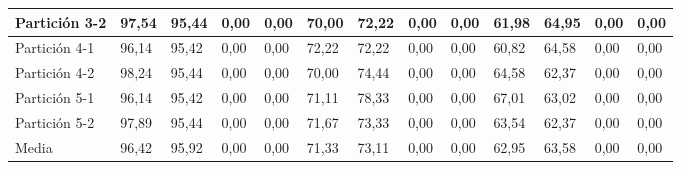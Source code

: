 \documentclass[10pt,a4paper]{article}
\begin{document}
\begin{table}[H]
{\begin{tabular}{l|l|l|l|l|l|l|l|l|l|l|l|l|}
\multicolumn{1}{|l|}{Partición 3-2} & 97,54        & 95,44         & 0,00    & 0,00 & 70,00        & 72,22         & 0,00    & 0,00 & 61,98        & 64,95         & 0,00    & 0,00 \\ \hline
\multicolumn{1}{|l|}{Partición 4-1} & 96,14        & 95,42         & 0,00    & 0,00 & 72,22        & 72,22         & 0,00    & 0,00 & 60,82        & 64,58         & 0,00    & 0,00 \\ \hline
\multicolumn{1}{|l|}{Partición 4-2} & 98,24        & 95,44         & 0,00    & 0,00 & 70,00        & 74,44         & 0,00    & 0,00 & 64,58        & 62,37         & 0,00    & 0,00 \\ \hline
\multicolumn{1}{|l|}{Partición 5-1} & 96,14        & 95,42         & 0,00    & 0,00 & 71,11        & 78,33         & 0,00    & 0,00 & 67,01        & 63,02         & 0,00    & 0,00 \\ \hline
\multicolumn{1}{|l|}{Partición 5-2} & 97,89        & 95,44         & 0,00    & 0,00 & 71,67        & 73,33         & 0,00    & 0,00 & 63,54        & 62,37         & 0,00    & 0,00 \\ \hline
\multicolumn{1}{|l|}{Media}         & 96,42        & 95,92         & 0,00    & 0,00 & 71,33        & 73,11         & 0,00    & 0,00 & 62,95        & 63,58         & 0,00    & 0,00 \\ \hline
\end{tabular}}
\end{table}
\end{document}
